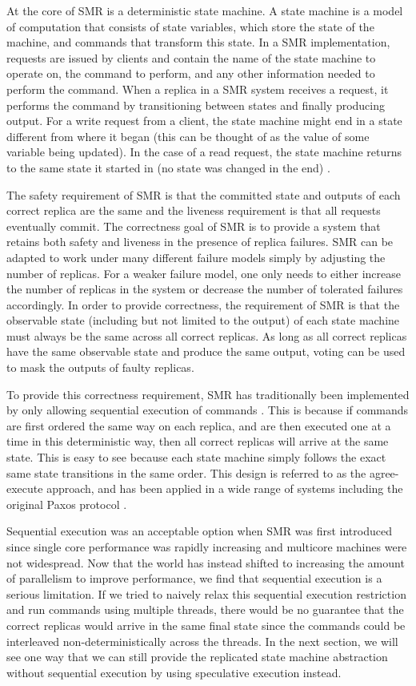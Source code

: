\documentclass[11pt, oneside]{report}
\begin{document}
At the core of SMR is a deterministic state machine. 
A state machine is a model of computation that consists of state variables, which store the state of the machine, and commands that transform this state. 
In a SMR implementation, requests are issued by clients and contain the name of the state machine to operate on, the command to perform, and any other information needed to perform the command. 
When a replica in a SMR system receives a request, it performs the command by transitioning between states and finally producing output. 
For a write request from a client, the state machine might end in a state different from where it began (this can be thought of as the value of some variable being updated). 
In the case of a read request, the state machine returns to the same state it started in (no state was changed in the end) \cite{schneider}.

The safety requirement of SMR is that the committed state and outputs of each correct replica are the same and the liveness requirement is that all requests eventually commit.
The correctness goal of SMR is to provide a system that retains both safety and liveness in the presence of replica failures. 
SMR can be adapted to work under many different failure models simply by adjusting the number of replicas. 
For a weaker failure model, one only needs to either increase the number of replicas in the system or decrease the number of tolerated failures accordingly.
In order to provide correctness, the requirement of SMR is that the observable state (including but not limited to the output) of each state machine must always be the same across all correct replicas.
As long as all correct replicas have the same observable state and produce the same output, voting can be used to mask the outputs of faulty replicas.

To provide this correctness requirement, SMR has traditionally been implemented by only allowing sequential execution of commands \cite{paxos, paxosMadeSimple, schneider}.
This is because if commands are first ordered the same way on each replica, and are then executed one at a time in this deterministic way, then all correct replicas will arrive at the same state. 
This is easy to see because each state machine simply follows the exact same state transitions in the same order. 
This design is referred to as the agree-execute approach, and has been applied in a wide range of systems including the original Paxos protocol \cite{paxos}.

Sequential execution was an acceptable option when SMR was first introduced since single core performance was rapidly increasing and multicore machines were not widespread. 
Now that the world has instead shifted to increasing the amount of parallelism to improve performance, we find that sequential execution is a serious limitation. 
If we tried to naively relax this sequential execution restriction and run commands using multiple threads, there would be no guarantee that the correct replicas would arrive in the same final state since the commands could be interleaved non-deterministically across the threads. 
In the next section, we will see one way that we can still provide the replicated state machine abstraction without sequential execution by using speculative execution instead. 
 
\end{document}
